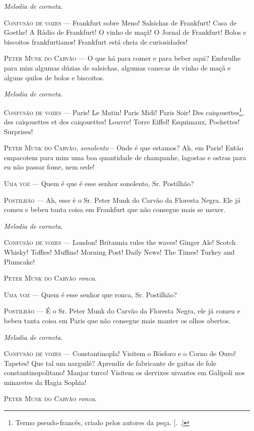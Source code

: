 \emph{Melodia de corneta}.

\textsc{Confusão de vozes} --- Frankfurt sobre Meno! Salsichas de Frankfurt! Casa
de Goethe! A Rádio de Frankfurt! O vinho de maçã! O Jornal de Frankfurt!
Bolos e biscoitos frankfurtianos! Frankfurt está cheia de curiosidades!

\textsc{Peter Munk do Carvão} --- O que há para comer e para beber aqui? Embrulhe
para mim algumas dúzias de salsichas, algumas canecas de vinho de maçã e
alguns quilos de bolos e biscoitos.

\emph{Melodia de corneta}.

\textsc{Confusão de vozes} --- Paris! Le Matin! Paris Midi! Paris Soir! Des
caiqouettes\footnote{Termo pseudo-francês, criado pelos autores da peça.
  [. .]}, des caiqouettes et des caiqouettes! Louvre! Torre
Eiffel! Esquimaux, Pochettes! Surprises!

\textsc{Peter Munk do Carvão}, \emph{sonolento} -- Onde é que estamos? Ah, em
Paris! Então empacotem para mim uma boa quantidade de champanhe,
lagostas e ostras para eu não passar fome, nem sede!

\textsc{Uma voz} --- Quem é que é esse senhor sonolento, Sr. Postilhão?

\textsc{Postilhão} --- Ah, esse é o Sr. Peter Munk do Carvão da Floresta Negra.
Ele já comeu e bebeu tanta coisa em Frankfurt que não consegue mais se
mexer.

\emph{Melodia de corneta}.

\textsc{Confusão de vozes} --- London! Britannia rules the waves! Ginger Ale!
Scotch Whisky! Toffies! Muffins! Morning Post! Daily News! The Times!
Turkey and Plumcake!

\textsc{Peter Munk do Carvão} \emph{ronca}.

\textsc{Uma voz} --- Quem é esse senhor que ronca, Sr. Postilhão?

\textsc{Postilhão} --- É o Sr. Peter Munk do Carvão da Floresta Negra, ele já
comeu e bebeu tanta coisa em Paris que não consegue mais manter os olhos
abertos.

\emph{Melodia de corneta}.

\textsc{Confusão de vozes} --- Constantinopla! Visitem o Bósforo e o Corno de
Ouro! Tapetes! Que tal um narguilé? Aprendiz de fabricante de gaitas de
fole constantinopolitano! Manjar turco! Visitem os dervixes uivantes em
Galípoli nos minaretes da Hagia Sophia!

\textsc{Peter Munk do Carvão} \emph{ronca}.

